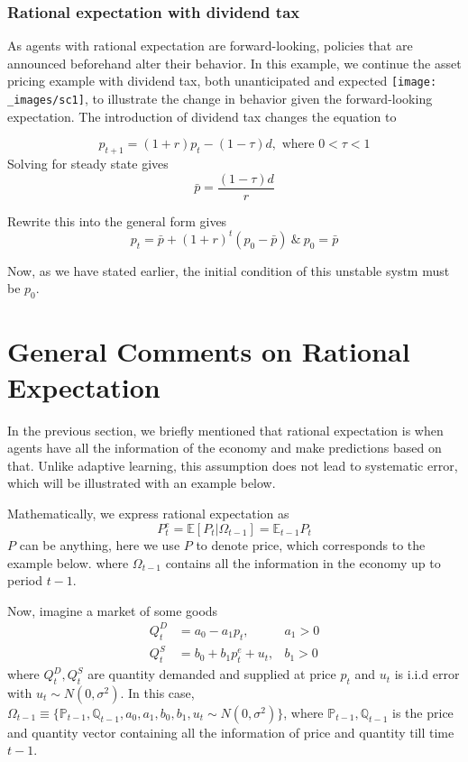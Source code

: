 \documentclass[twocolumn, fleqn]{article}
\begin{document}
			\subsubsection{Rational expectation with dividend tax}
				As agents with rational expectation are forward-looking, policies that are announced beforehand alter their behavior.
				In this example, we continue the asset pricing example with dividend tax, both unanticipated and expected
				\texttt{[image: \_images/sc1]},
				to illustrate the change in behavior given the forward-looking expectation.
				The introduction of dividend tax changes the equation to

				\begin{equation*}
					p_{t+1} = (1+r)p_t - (1-\tau)d, \text{ where } 0<\tau<1
				\end{equation*}
				Solving for steady state gives
				\begin{equation*}
					\bar{p} = \frac{(1-\tau)d}{r}
				\end{equation*}

				Rewrite this into the general form gives
				\begin{equation*}
					p_t = \bar{p} + (1+r)^t(p_0-\bar{p}) \ \& \ p_0 = \bar{p}
				\end{equation*}

				Now, as we have stated earlier, the initial condition of this unstable systm must be $p_0$.


	\section{General Comments on Rational Expectation}
		In the previous section, we briefly mentioned that rational expectation is when agents have all the
		information of the economy and make predictions based on that.
		Unlike adaptive learning, this assumption does not lead to systematic error, which will be illustrated with
		an example below.

		Mathematically, we express rational expectation as
		\begin{equation}
			P_{t}^e = \mathbb{E}[P_t|\Omega_{t-1}] = \mathbb{E}_{t-1}P_t
		\end{equation}
		$P$ can be anything, here we use $P$ to denote price, which corresponds to the example below.
		where $\Omega_{t-1}$ contains all the information in the economy up to period $t-1$.

		Now, imagine a market of some goods
		\begin{align*}
			Q_t^D &= a_0 -a_1 p_t, &a_1>0\\
			Q_t^S &= b_0 + b_1 p_t^e +u_t, &b_1>0
		\end{align*}
		where $Q_t^D, Q_t^S$ are quantity demanded and supplied at price $p_t$ and $u_t$ is i.i.d error with
		$u_t \sim N(0,\sigma^2)$.
		In this case, $\Omega_{t-1} \equiv \{\mathbb{P}_{t-1}, \mathbb{Q}_{t-1}, a_0, a_1, b_0, b_1, u_t \sim N(0,\sigma^2)\}$, where $\mathbb{P}_{t-1}, \mathbb{Q}_{t-1}$ is the price and quantity vector containing all the information of price and quantity till time $t-1$.
\end{document}
